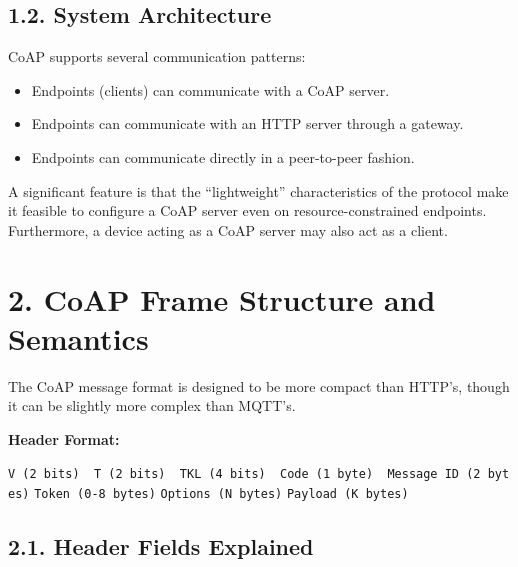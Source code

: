 \documentclass[a4paper, 12pt]{book} %
\begin{document}
\subsection{1.2. System Architecture}\label{system-architecture}

CoAP supports several communication patterns:

\begin{itemize}
\tightlist
\item
  Endpoints (clients) can communicate with a CoAP server.
\item
  Endpoints can communicate with an HTTP server through a gateway.
\item
  Endpoints can communicate directly in a peer-to-peer fashion.
\end{itemize}

A significant feature is that the ``lightweight'' characteristics of the
protocol make it feasible to configure a CoAP server even on
resource-constrained endpoints. Furthermore, a device acting as a CoAP
server may also act as a client.

\section{2. CoAP Frame Structure and
Semantics}\label{coap-frame-structure-and-semantics}

The CoAP message format is designed to be more compact than HTTP's,
though it can be slightly more complex than MQTT's.

\textbf{Header Format:}

\texttt{V\ (2\ bits)\ \textbar{}\ T\ (2\ bits)\ \textbar{}\ TKL\ (4\ bits)\ \textbar{}\ Code\ (1\ byte)\ \textbar{}\ Message\ ID\ (2\ bytes)}
\texttt{Token\ (0-8\ bytes)} \texttt{Options\ (N\ bytes)}
\texttt{Payload\ (K\ bytes)}

\subsection{2.1. Header Fields Explained}\label{header-fields-explained}
\end{document}
